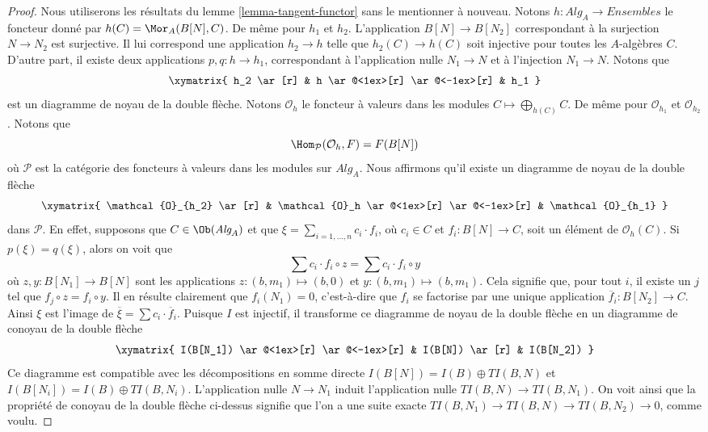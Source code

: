 \begin{proof}
Nous utiliserons les résultats du
lemme \ref{lemma-tangent-functor}
sans le mentionner à nouveau.
Notons $h : \textit{Alg}_A \to \textit{Ensembles}$ le foncteur donné par
$h(C) = \Mor_A(B[N], C)$. De même pour $h_1$ et $h_2$.
L'application $B[N] \to B[N_2]$ correspondant à la surjection $N \to N_2$
est surjective. Il lui correspond une application $h_2 \to h$ telle que
$h_2(C) \to h(C)$ soit injective pour toutes les $A$-algèbres $C$. D'autre
part, il existe deux applications $p, q : h \to h_1$, correspondant à
l'application nulle $N_1 \to N$ et à l'injection $N_1 \to N$. Notons que
$$
\xymatrix{
h_2 \ar[r] & h \ar@<1ex>[r] \ar@<-1ex>[r] & h_1
}
$$
est un diagramme de noyau de la double flèche. Notons $\mathcal{O}_h$ le foncteur à valeurs dans les modules
$C \mapsto \bigoplus_{h(C)} C$. De même pour $\mathcal{O}_{h_1}$ et
$\mathcal{O}_{h_2}$. Notons que
$$
\Hom_\mathcal{P}(\mathcal{O}_h, F) = F(B[N])
$$
où $\mathcal{P}$ est la catégorie des foncteurs à valeurs dans les modules sur
$\textit{Alg}_A$. Nous affirmons qu'il existe un diagramme de noyau de la double flèche
$$
\xymatrix{
\mathcal{O}_{h_2} \ar[r] &
\mathcal{O}_h \ar@<1ex>[r] \ar@<-1ex>[r] &
\mathcal{O}_{h_1}
}
$$
dans $\mathcal{P}$. En effet, supposons que $C \in \Ob(\textit{Alg}_A)$
et que $\xi = \sum_{i = 1, \ldots, n} c_i \cdot f_i$, où $c_i \in C$ et
$f_i : B[N] \to C$, soit un élément de
$\mathcal{O}_h(C)$. Si $p(\xi) = q(\xi)$, alors
on voit que
$$
\sum c_i \cdot f_i \circ z = \sum c_i \cdot f_i \circ y
$$
où $z, y : B[N_1] \to B[N]$ sont les applications $z : (b, m_1) \mapsto (b, 0)$
et $y : (b, m_1) \mapsto (b, m_1)$. Cela signifie que, pour tout $i$,
il existe un $j$ tel que $f_j \circ z = f_i \circ y$. Il en résulte clairement
que $f_i(N_1) = 0$, c'est-à-dire que $f_i$ se factorise par une unique application
$\overline{f}_i : B[N_2] \to C$. Ainsi $\xi$ est l'image de
$\overline{\xi} = \sum c_i \cdot \overline{f}_i$.
Puisque $I$ est injectif, il transforme ce diagramme de noyau de la double flèche
en un diagramme de conoyau de la double flèche
$$
\xymatrix{
I(B[N_1]) \ar@<1ex>[r] \ar@<-1ex>[r] &
I(B[N]) \ar[r] &
I(B[N_2])
}
$$
Ce diagramme est compatible avec les décompositions en somme directe
$I(B[N]) = I(B) \oplus TI(B, N)$ et $I(B[N_i]) = I(B) \oplus TI(B, N_i)$.
L'application nulle $N \to N_1$ induit l'application nulle $TI(B, N) \to TI(B, N_1)$.
On voit ainsi que la propriété de conoyau de la double flèche
ci-dessus signifie que l'on a une suite exacte
$TI(B, N_1) \to TI(B, N) \to TI(B, N_2) \to 0$,
comme voulu.
\end{proof}

